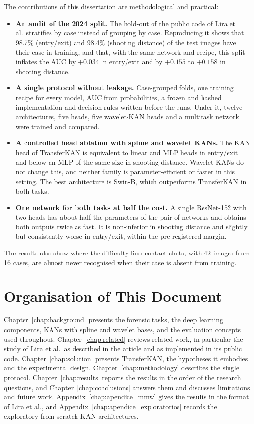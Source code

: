 The contributions of this dissertation are methodological and practical:
\begin{itemize}
    \item \textbf{An audit of the 2024 split.} The hold-out of the public code of Lira et al.\ stratifies by case instead of grouping by case. Reproducing it shows that 98.7\% (entry/exit) and 98.4\% (shooting distance) of the test images have their case in training, and that, with the same network and recipe, this split inflates the AUC by $+0.034$ in entry/exit and by $+0.155$ to $+0.158$ in shooting distance.
    \item \textbf{A single protocol without leakage.} Case-grouped folds, one training recipe for every model, AUC from probabilities, a frozen and hashed implementation and decision rules written before the runs. Under it, twelve architectures, five heads, five wavelet-KAN heads and a multitask network were trained and compared.
    \item \textbf{A controlled head ablation with spline and wavelet KANs.} The KAN head of TransferKAN is equivalent to linear and MLP heads in entry/exit and below an MLP of the same size in shooting distance. Wavelet KANs do not change this, and neither family is parameter-efficient or faster in this setting. The best architecture is Swin-B, which outperforms TransferKAN in both tasks.
    \item \textbf{One network for both tasks at half the cost.} A single ResNet-152 with two heads has about half the parameters of the pair of networks and obtains both outputs twice as fast. It is non-inferior in shooting distance and slightly but consistently worse in entry/exit, within the pre-registered margin.
\end{itemize}
The results also show where the difficulty lies: contact shots, with 42 images from 16 cases, are almost never recognised when their case is absent from training.

\section{Organisation of This Document}
\label{sec_about}

Chapter~\ref{chap:background} presents the forensic tasks, the deep learning components, KANs with spline and wavelet bases, and the evaluation concepts used throughout. Chapter~\ref{chap:related} reviews related work, in particular the study of Lira et al.\ as described in the article and as implemented in its public code. Chapter~\ref{chap:solution} presents TransferKAN, the hypotheses it embodies and the experimental design. Chapter~\ref{chap:methodology} describes the single protocol. Chapter~\ref{chap:results} reports the results in the order of the research questions, and Chapter~\ref{chap:conclusions} answers them and discusses limitations and future work. Appendix~\ref{chap:apendice_mmw} gives the results in the format of Lira et al., and Appendix~\ref{chap:apendice_exploratorios} records the exploratory from-scratch KAN architectures.
